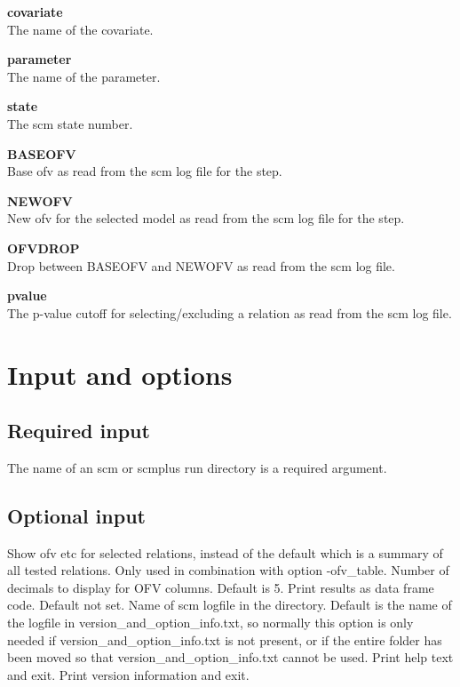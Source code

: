 \documentclass[hideglossary,notoc,hidelof,hidelot,hideTheSignaturePage,hideLinkCurrent,hideloa,pdfLatex,noClient,notitle,hideConfidential]{PMXstyle-20170118kajsa4}
\begin{document}
{\bfseries covariate}\\
The name of the covariate.

{\bfseries parameter}\\
The name of the parameter.

{\bfseries state}\\
The scm state number.

{\bfseries BASEOFV}\\
Base ofv as read from the scm log file for the step.

{\bfseries NEWOFV}\\
New ofv for the selected model as read from the scm log file for the step.

{\bfseries OFVDROP}\\
Drop between BASEOFV and NEWOFV as read from the scm log file.

{\bfseries pvalue}\\
The p-value cutoff for selecting/excluding a relation as read from the scm log file.

\section{Input and options}

\subsection{Required input}
The name of an scm or scmplus run directory is a required argument.

\subsection{Optional input}

\begin{optionlist}
Show ofv etc for selected relations, instead of the default which is
a summary of all tested relations.
\nextopt
{}
Only used in combination with option -ofv\_table.
Number of decimals to display for OFV columns. Default is 5.
\nextopt
{}
Print results as data frame code. Default not set.
\nextopt
{}
Name of scm logfile in the directory. 
Default is the name of the logfile in
version\_and\_option\_info.txt, 
so normally this option is only needed if version\_and\_option\_info.txt is not present,
or if the entire folder has been moved so that version\_and\_option\_info.txt cannot be used.
\nextopt
{}
Print help text and exit.
\nextopt
{}
Print version information and exit.
\nextopt
\end{optionlist}
\end{document}
